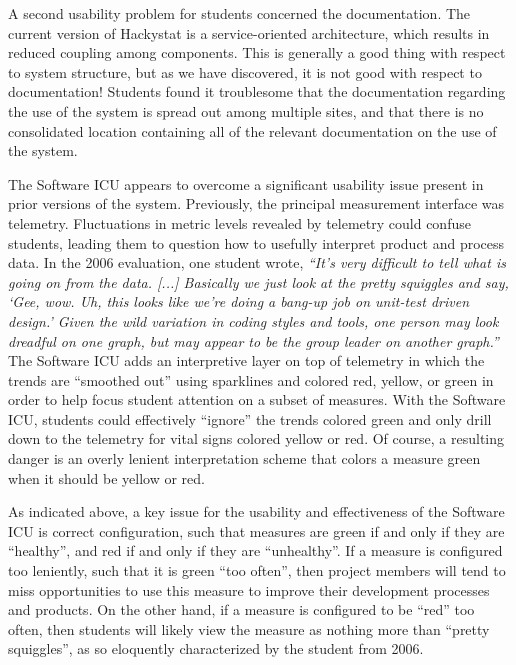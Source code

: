 \documentclass[times,10pt,twocolumn]{article}
\begin{document}
A second usability problem for students concerned the documentation.  The
current version of Hackystat is a service-oriented architecture, which
results in reduced coupling among components.  This is generally a good
thing with respect to system structure, but as we have discovered, it is
not good with respect to documentation!  Students found it troublesome that
the documentation regarding the use of the system is spread out among
multiple sites, and that there is no consolidated location containing all
of the relevant documentation on the use of the system.

The Software ICU appears to overcome a significant usability issue present
in prior versions of the system. Previously, the principal measurement
interface was telemetry.  Fluctuations in metric levels revealed by
telemetry could confuse students, leading them to question how to usefully
interpret product and process data.  In the 2006 evaluation, one student
wrote, {\em ``It's very difficult to tell what is going on from the
data. [...] Basically we just look at the pretty squiggles and say, `Gee,
wow. Uh, this looks like we're doing a bang-up job on unit-test driven
design.' Given the wild variation in coding styles and tools, one person
may look dreadful on one graph, but may appear to be the group leader on
another graph.''}  The Software ICU adds an interpretive layer on top of
telemetry in which the trends are ``smoothed out'' using sparklines and
colored red, yellow, or green in order to help focus student attention on a
subset of measures.  With the Software ICU, students could effectively
``ignore'' the trends colored green and only drill down to the telemetry
for vital signs colored yellow or red.  Of course, a resulting danger is an
overly lenient interpretation scheme that colors a measure green when it
should be yellow or red.


As indicated above, a key issue for the usability and effectiveness of the
Software ICU is correct configuration, such that measures are green if and
only if they are ``healthy'', and red if and only if they are
``unhealthy''.  If a measure is configured too leniently, such that it is
green ``too often'', then project members will tend to miss opportunities
to use this measure to improve their development processes and products.
On the other hand, if a measure is configured to be ``red'' too often, then
students will likely view the measure as nothing more than ``pretty
squiggles'', as so eloquently characterized by the student from 2006.
\end{document}
